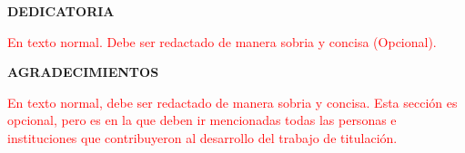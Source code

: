 \documentclass[journal]{IEEEtran}
\begin{document}
\newpage

\begin{center}
\textbf{\fontsize{14}{16}\selectfont DEDICATORIA}\\
\end{center}
\vspace{10pt}

{
\setlength{\parindent}{3em}
\hspace{1pt}
\fontsize{12}{14}\selectfont 

\textcolor{red}{En texto normal. Debe ser redactado de manera sobria y concisa (Opcional).}

}
\newpage


\begin{center}
\textbf{\fontsize{14}{16}\selectfont AGRADECIMIENTOS}\\
\end{center}
\vspace{10pt}
\fontsize{12}{14}\selectfont 

{
\setlength{\parindent}{3em}
\hspace{1pt}

\textcolor{red}{En texto normal, debe ser redactado de manera sobria y concisa. Esta sección es opcional, pero es en la que deben ir mencionadas todas las personas e instituciones que contribuyeron al desarrollo del trabajo de titulación.}

}
\newpage
\end{document}
